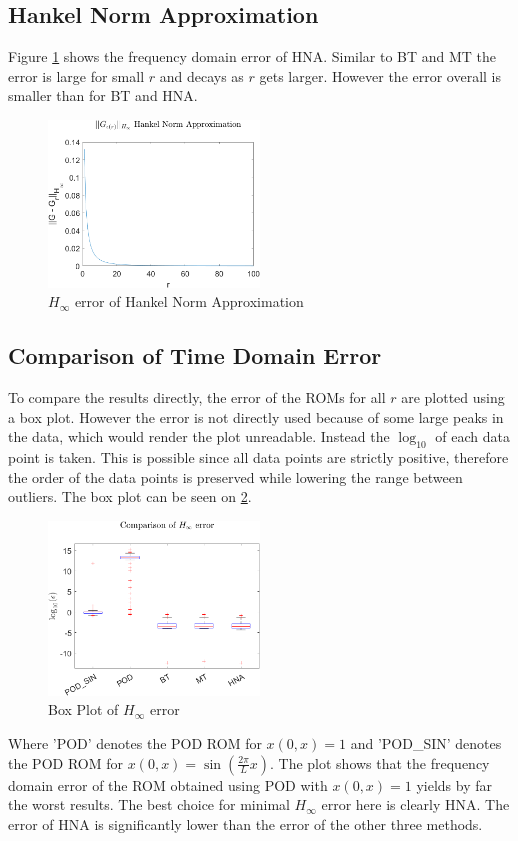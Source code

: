 \subsection{Hankel Norm Approximation}
Figure \ref{FIG-H-HNA} shows the frequency domain error of HNA.
Similar to BT and MT the error is large for small \(r\) and decays as \(r\) gets larger.
However the error overall is smaller than for BT and HNA.
\begin{figure}[H]
\centering
\includegraphics[width=0.5\textwidth]{images/freq/H_HNA}
\caption{$H_{\infty}$ error of Hankel Norm Approximation}
\label{FIG-H-HNA}
\end{figure}

\subsection{Comparison of Time Domain Error}
To compare the results directly, the error of the ROMs for all \(r\) are plotted using a box plot.
However the error is not directly used because of some large peaks in the data, which would render the plot unreadable.
Instead the \(\log_{10}\) of each data point is taken.
This is possible since all data points are strictly positive, therefore the order of the data points is preserved while lowering the range between outliers.
The box plot can be seen on \ref{FIG-H-BOX}.
\begin{figure}[H]
\centering
\includegraphics[width=0.5\textwidth]{images/freq/H_BOX}
\caption{Box Plot of $H_{\infty}$ error}
\label{FIG-H-BOX}
\end{figure}
Where 'POD' denotes the POD ROM for \(x(0, x) = 1\) and 'POD\_SIN' denotes the POD ROM for \(x(0, x) =  \sin(\frac{2\pi}{L}x)\).
The plot shows that the frequency domain error of the ROM obtained using POD with \(x(0, x) = 1\) yields by far the worst results.
The best choice for minimal \(H_{\infty}\) error here is clearly HNA. 
The error of HNA is significantly lower than the error of the other three methods.

